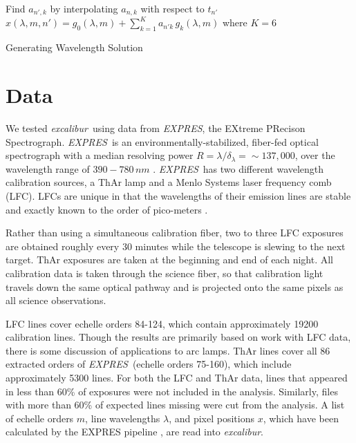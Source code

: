 \documentclass[modern]{aastex63}
\newcommand{\project}[1]{\textsl{#1}}
\newcommand{\name}{\project{excalibur}}
\newcommand{\acronym}[1]{{\small{#1}}}
\newcommand{\expres}{\project{\acronym{EXPRES}}}
\begin{document}
\begin{algorithm}
\SetAlgoLined
{}

Find $a_{n',k}$ by interpolating $a_{n,k}$ with respect to $t_{n'}$\;
$x(\lambda,m,n') = g_0(\lambda,m) + \sum_{k=1}^K a_{n'k}\,g_k(\lambda,m)$ where $K=6$\;
\caption{Generating Wavelength Solution}
\end{algorithm}


\section{Data} \label{sec:data}
We tested \name\ using data from \expres, the EXtreme PRecison Spectrograph.  \expres\ is an environmentally-stabilized, fiber-fed optical spectrograph with a median resolving power $R=\lambda/\delta_{\lambda}=\sim137,000$, over the wavelength range of $390-780\, nm$ \citep{jurgenson2016, blackman2020}.  \expres\ has two different wavelength calibration sources, a ThAr lamp and a Menlo Systems laser frequency comb (LFC).  LFCs are unique in that the wavelengths of their emission lines are stable and exactly known to the order of pico-meters  \citep{wilken2012, molaro2013, probst2014}.

Rather than using a simultaneous calibration fiber, two to three LFC exposures are obtained roughly every 30 minutes while the telescope is slewing to the next target.  ThAr exposures are taken at the beginning and end of each night.  All calibration data is taken through the science fiber, so that calibration light travels down the same optical pathway and is projected onto the same pixels as all science observations.

LFC lines cover echelle orders 84-124, which contain approximately 19200 calibration lines.  Though the results are primarily based on work with LFC data, there is some discussion of applications to arc lamps.   ThAr lines cover all 86 extracted orders of \expres\ (echelle orders 75-160), which include approximately 5300 lines.  For both the LFC and ThAr data, lines that appeared in less than 60\% of exposures were not included in the analysis.  Similarly, files with more than 60\% of expected lines missing were cut from the analysis.  A list of echelle orders $m$, line wavelengths $\lambda$, and pixel positions $x$, which have been calculated by the EXPRES pipeline \citep{petersburg2020}, are read into \name.
\end{document}
